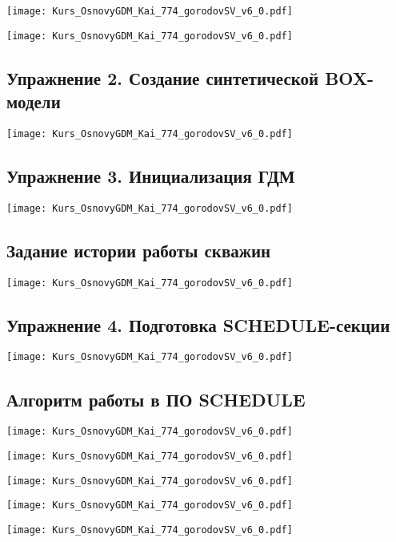 \documentclass[main.tex]{subfiles}
\begin{document}
\texttt{[image: Kurs\_OsnovyGDM\_Kai\_774\_gorodovSV\_v6\_0.pdf]}

\texttt{[image: Kurs\_OsnovyGDM\_Kai\_774\_gorodovSV\_v6\_0.pdf]}

\subsection{Упражнение 2. Создание синтетической BOX-модели}

\texttt{[image: Kurs\_OsnovyGDM\_Kai\_774\_gorodovSV\_v6\_0.pdf]}

\subsection{Упражнение 3. Инициализация ГДМ}

\texttt{[image: Kurs\_OsnovyGDM\_Kai\_774\_gorodovSV\_v6\_0.pdf]}

\subsection{Задание истории работы скважин}

\texttt{[image: Kurs\_OsnovyGDM\_Kai\_774\_gorodovSV\_v6\_0.pdf]}

\subsection{Упражнение 4. Подготовка SCHEDULE-секции}

\texttt{[image: Kurs\_OsnovyGDM\_Kai\_774\_gorodovSV\_v6\_0.pdf]}

\subsection{Алгоритм работы в ПО SCHEDULE}

\texttt{[image: Kurs\_OsnovyGDM\_Kai\_774\_gorodovSV\_v6\_0.pdf]}

\texttt{[image: Kurs\_OsnovyGDM\_Kai\_774\_gorodovSV\_v6\_0.pdf]}

\texttt{[image: Kurs\_OsnovyGDM\_Kai\_774\_gorodovSV\_v6\_0.pdf]}

\texttt{[image: Kurs\_OsnovyGDM\_Kai\_774\_gorodovSV\_v6\_0.pdf]}

\texttt{[image: Kurs\_OsnovyGDM\_Kai\_774\_gorodovSV\_v6\_0.pdf]}
\end{document}
